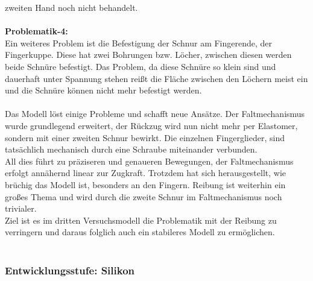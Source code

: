 \documentclass[titlepage,12pt,twoside]{article}
\begin{document}
zweiten Hand noch nicht behandelt. \\
\\
\textbf{Problematik-4: } \\
Ein weiteres Problem ist die Befestigung der Schnur am Fingerende, der Fingerkuppe. Diese hat zwei Bohrungen bzw. Löcher, zwischen diesen werden beide Schnüre befestigt. Das Problem, da diese Schnüre so klein sind und dauerhaft 
unter Spannung stehen reißt die Fläche zwischen den Löchern meist ein und die Schnüre können nicht mehr befestigt werden. \\
\\
Das Modell löst einige Probleme und schafft neue Ansätze. Der Faltmechanismus wurde grundlegend erweitert, der Rückzug wird nun nicht mehr per Elastomer, sondern mit einer zweiten Schnur bewirkt.
Die einzelnen Fingerglieder, sind tatsächlich mechanisch durch eine Schraube miteinander verbunden. \\
All dies führt zu präziseren und genaueren Bewegungen, der Faltmechanismus erfolgt annähernd linear zur Zugkraft. Trotzdem hat sich herausgestellt, wie brüchig das Modell ist, besonders an den Fingern. Reibung ist weiterhin ein großes Thema und 
wird durch die zweite Schnur im Faltmechanismus noch trivialer. \\
Ziel ist es im dritten Versuchsmodell die Problematik mit der Reibung zu verringern und daraus folglich auch ein stabileres Modell zu ermöglichen.\\
\\

\subsubsection{Entwicklungsstufe: Silikon}
\label{chap:Entwicklungsstufe: Silikon}
\end{document}
